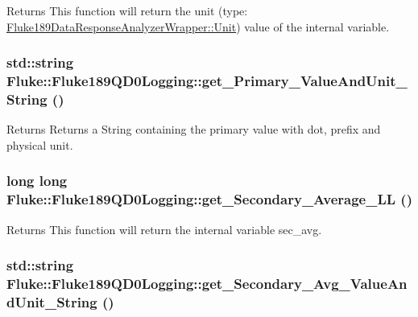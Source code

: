 \label{classFluke_1_1Fluke189QD0Logging_a864f0f60f6995d5d035163caf0651565}
\begin{DoxyReturn}{Returns}
This function will return the unit (type: \hyperlink{classFluke_1_1Fluke189DataResponseAnalyzerWrapper_ab8e5f2306e4d2ad3d741d273793aaed1}{Fluke189DataResponseAnalyzerWrapper::Unit}) value of the internal variable. 
\end{DoxyReturn}
\hypertarget{classFluke_1_1Fluke189QD0Logging_a1ab6475394ca111e1afcd044d4f278e7}{
\subsubsection[{get\_\-Primary\_\-ValueAndUnit\_\-String}]{\setlength{\rightskip}{0pt plus 5cm}std::string Fluke::Fluke189QD0Logging::get\_\-Primary\_\-ValueAndUnit\_\-String ()}}
\label{classFluke_1_1Fluke189QD0Logging_a1ab6475394ca111e1afcd044d4f278e7}
\begin{DoxyReturn}{Returns}
Returns a String containing the primary value with dot, prefix and physical unit. 
\end{DoxyReturn}
\hypertarget{classFluke_1_1Fluke189QD0Logging_a1f33bcc2d2342018f0a1ef5b4ec3caa0}{
\subsubsection[{get\_\-Secondary\_\-Average\_\-LL}]{\setlength{\rightskip}{0pt plus 5cm}long long Fluke::Fluke189QD0Logging::get\_\-Secondary\_\-Average\_\-LL ()}}
\label{classFluke_1_1Fluke189QD0Logging_a1f33bcc2d2342018f0a1ef5b4ec3caa0}
\begin{DoxyReturn}{Returns}
This function will return the internal variable sec\_\-avg. 
\end{DoxyReturn}
\hypertarget{classFluke_1_1Fluke189QD0Logging_a34ee9e63eb8b4b44e76fcde20856898c}{
\subsubsection[{get\_\-Secondary\_\-Avg\_\-ValueAndUnit\_\-String}]{\setlength{\rightskip}{0pt plus 5cm}std::string Fluke::Fluke189QD0Logging::get\_\-Secondary\_\-Avg\_\-ValueAndUnit\_\-String ()}}
